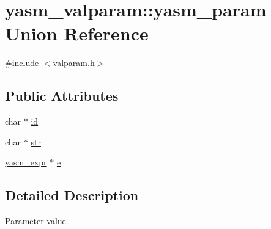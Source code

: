 \hypertarget{unionyasm__valparam_1_1yasm__param}{\section{yasm\-\_\-valparam\-:\-:yasm\-\_\-param Union Reference}
\label{unionyasm__valparam_1_1yasm__param}
}


{\ttfamily \#include $<$valparam.\-h$>$}

\subsection*{Public Attributes}
\begin{DoxyCompactItemize}
\item 
char $\ast$ \hyperlink{unionyasm__valparam_1_1yasm__param_a4141b7871748921850acc6997b20ae7b}{id}
\item 
char $\ast$ \hyperlink{unionyasm__valparam_1_1yasm__param_a0021321bc7cf76e737a0ccb9570327d7}{str}
\item 
\hyperlink{structyasm__expr}{yasm\-\_\-expr} $\ast$ \hyperlink{unionyasm__valparam_1_1yasm__param_a4a4970b5951111eebeb7cc3a74357b4c}{e}
\end{DoxyCompactItemize}


\subsection{Detailed Description}
Parameter value. 

